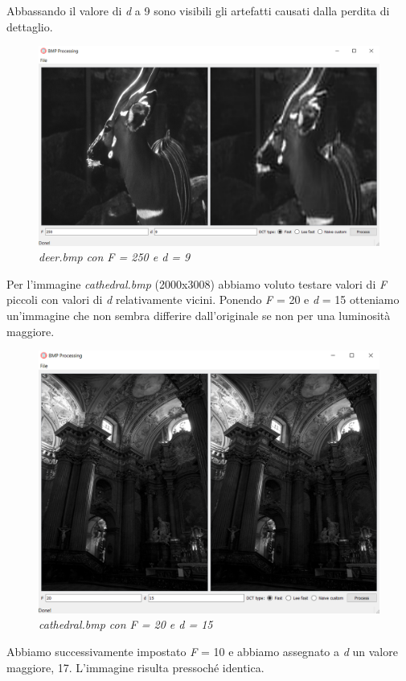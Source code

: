 \documentclass[a4paper,12pt]{report}
\begin{document}
\noindent Abbassando il valore di \textit{d} a 9 sono visibili gli artefatti causati dalla perdita di dettaglio.
\bigskip

\begin{figure}[H]
\centering
\includegraphics[width=0.75\linewidth]{../img/bambi_250_9.png}
\caption{\textit{deer.bmp con F = 250 e d = 9}}
\end{figure}

\newpage
\noindent Per l'immagine \textit{cathedral.bmp} (2000x3008) abbiamo voluto testare valori di \textit{F} piccoli con valori di \textit{d} relativamente vicini.
Ponendo \textit{F} = 20 e \textit{d} = 15 otteniamo un'immagine che non sembra differire dall'originale se non per una luminosità maggiore.

\begin{figure}[H]
\centering
\includegraphics[width=0.65\linewidth]{../img/cathedral_20_15.png}
\caption{\textit{cathedral.bmp con F = 20 e d = 15}}
\end{figure}

\noindent Abbiamo successivamente impostato \textit{F} = 10 e abbiamo assegnato a \textit{d} un valore maggiore, 17. L'immagine risulta pressoché identica.
\end{document}
